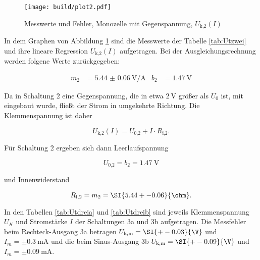   \begin{figure}[h]
    \centering
    \texttt{[image: build/plot2.pdf]}
    \caption{Messwerte und Fehler, Monozelle mit Gegenspannung, $U_\text{k,2}(I)$}
    \label{fig:Uzwei}
  \end{figure}

  In dem Graphen von Abbildung \ref{fig:Uzwei} sind die Messwerte der Tabelle
  \ref{tab:Utzwei} und ihre lineare Regression
  $U_\text{k,2}(I)$ aufgetragen.
  Bei der Ausgleichungsrechnung werden folgene Werte zurückgegeben:

  \begin{align}
    m_2 & = \SI{5.44(6)}{\V\per\A} & b_2 & = \SI{1.47}{\V}
  \end{align}

  Da in Schaltung 2 eine Gegenspannung, die in etwa $\SI{2}{\V}$ größer als
  $U_0$ ist, mit eingebaut wurde, fließt der Strom in umgekehrte Richtung.
  Die Klemmenspannung ist daher

  \begin{equation}
    U_\text{k,2}(I) = U_\text{0,2} + I \cdot R_\text{i,2}.
  \end{equation}

  Für Schaltung 2 ergeben sich dann Leerlaufspannung

  \begin{equation}
    U_\text{0,2} = b_2 = \SI{1.47}{\V}
  \end{equation}

  und Innenwiderstand

  \begin{equation}
    R_\text{i,2} = m_2 = \SI{5.44 +- 0.06}{\ohm}.
  \end{equation}

  In den Tabellen \ref{tab:Utdreia} und \ref{tab:Utdreib} sind jeweils
  Klemmenspannung $U_K$ und Stromstärke $I$
  der Schaltungen 3a und 3b aufgetragen.
  Die Messfehler beim Rechteck-Ausgang 3a betragen
  $U_\text{k,m} = \SI{+-0.03}{\V}$ und $I_m = \pm \SI{0.3}{\milli\A}$ und die
  beim Sinus-Ausgang 3b $U_\text{k,m} = \SI{+-0.09}{\V}$ und
  $I_m = \pm \SI{0.09}{\milli\A}$.

